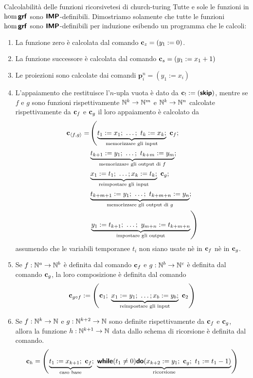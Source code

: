 \documentclass[openany]{book}
\begin{document}
\begin{theorem}{Calcolabilità delle funzioni ricorsive}{tesi di church-turing}
    Tutte e sole le funzioni in $\hom\text{\sffamily\textbf{grf}}$ sono $\text{\sffamily\textbf{IMP}}$-definibili.
    \proof 
    Dimostriamo solamente che tutte le funzioni $\hom\text{\sffamily\textbf{grf}}$ sono $\text{\sffamily\textbf{IMP}}$-definibili per induzione esibendo un programma che le calcoli:\begin{enumerate}
        \item La funzione zero è calcolata dal comando $\mathbf{c}_z = (y_1 := 0)$.
        \item La funzione successore è calcolata dal comando $\mathbf{c}_s = (y_1 := x_1+1)$
        \item Le proiezioni sono calcolate dai comandi $\mathbf{p}_i^n = (y_1 := x_i)$
        \item L'appaiamento che restituisce l'$n$-upla vuota è dato da $\mathbf{c}_! := (\text{\sffamily\textbf{skip}})$, mentre se $f$ e $g$ sono funzioni rispettivamente $\mathbb{N}^k \to \mathbb{N}^m$ e $\mathbb{N}^{k}\to\mathbb{N}^{n}$ calcolate rispettivamente da $\mathbf{c}_f$ e $\mathbf{c}_g$ il loro appaiamento è calcolato da
        \begin{align*}
            \mathbf{c}_{\langle f,g \rangle} = & \left( \underbrace{t_1 := x_1; \ \dots;\ t_k := x_k;}_{\text{memorizzare gli input}}\ \mathbf{c}_f ;\right.\\ &  \underbrace{t_{k+1} := y_1;\ \dots;\ t_{k+m}:= y_m}_{\text{memorizzare gli output di } f};\\ & \underbrace{x_1 := t_1;\ \dots; x_k := t_k;}_{\text{reimpostare gli input}}\ \mathbf{c}_g; \\
             &  \underbrace{t_{k+m+1}:= y_1;\ \dots;\ t_{k+m+n}:= y_n}_{\text{memorizzare gli output di }g};\\ & \left. \underbrace{y_1 := t_{k+1};\ \dots;\ y_{m+n}:= t_{k+m+n}}_{\text{impostare gli output}}  \right)
        \end{align*}
        assumendo che le variabili temporanee $t_i$ non siano usate nè in $\mathbf{c}_f$ nè in $\mathbf{c}_g$.
        \item Se $f : \mathbb{N}^a\to\mathbb{N}^b$ è definita dal comando $\mathbf{c}_f$ e $g: \mathbb{N}^b\to\mathbb{N}^c$ è definita dal comando $\mathbf{c}_g$, la loro composizione è definita dal comando
        \[ \c_{g\circ f} := \left( \c_1 ;\ \underbrace{x_1 := y_1 ; \ \dots ; x_b := y_b ;}_{\text{reimpostare gli input}}\ \c_2 \right) \]
        \item Se $f: \mathbb{N}^k \to \mathbb{N}$ e $g:\mathbb{N}^{k+2}\to\mathbb{N}$ sono definite rispettivamente da $\mathbf{c}_f$ e $\mathbf{c}_g$, allora la funzione $h : \mathbb{N}^{k+1}\to\mathbb{N}$ data dallo schema di ricorsione è definita dal comando.
        \[ \c_h = \left( \underbrace{t_1 := x_{k+1};\ \c_f}_{\text{caso base}};\ \underbrace{\while(t_1 \neq 0)\doc(x_{k+2}:= y_1;\ \c_g;\ t_1 := t_1-1)}_{\text{ricorsione}} \right) \]

\end{enumerate}
\end{theorem}
\end{document}
